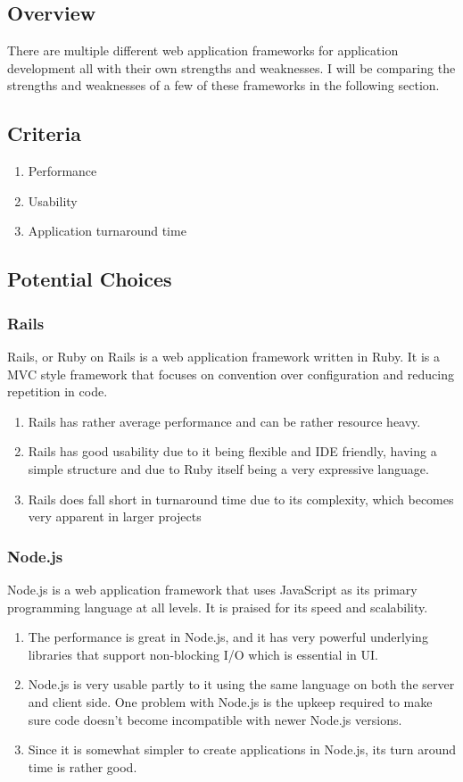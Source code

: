 \documentclass[onecolumn, draftclsnofoot,10pt, compsoc]{IEEEtran}
\begin{document}
\subsection{Overview}
There are multiple different web application frameworks for application development all with their own strengths and weaknesses. I will be comparing the strengths and weaknesses of a few of these frameworks in the following section.

\subsection{Criteria}
\begin{enumerate}
\item Performance
\item Usability
\item Application turnaround time
\end{enumerate}

\subsection{Potential Choices}

\subsubsection{Rails}
Rails, or Ruby on Rails is a web application framework written in Ruby. It is a MVC style framework that focuses on convention over configuration and reducing repetition in code.
\begin{enumerate}
\item Rails has rather average performance and can be rather resource heavy.
\item Rails has good usability due to it being flexible and IDE friendly, having a simple structure and due to Ruby itself being a very expressive language.
\item Rails does fall short in turnaround time due to its complexity, which becomes very apparent in larger projects
\end{enumerate}

\subsubsection{Node.js}
Node.js is a web application framework that uses JavaScript as its primary programming language at all levels. It is praised for its speed and scalability.
\begin{enumerate}
\item The performance is great in Node.js, and it has very powerful underlying libraries that support non-blocking I/O which is essential in UI.
\item Node.js is very usable partly to it using the same language on both the server and client side. One problem with Node.js is the upkeep required to make sure code doesn't become incompatible with newer Node.js versions.
\item Since it is somewhat simpler to create applications in Node.js, its turn around time is rather good.
\end{enumerate}
\end{document}
